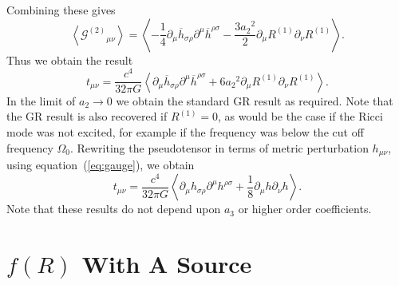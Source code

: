\documentclass[a4paper, 11pt, titlepage, twoside]{report}
\newcommand{\eqnref}[1]{equation~(\ref{eq:#1})}
\newcommand{\recip}[1]{\ensuremath{\frac{1}{#1}}}
\begin{document}
Combining these gives
\begin{equation}
\left\langle {\mathcal{G}^{(2)}}_{\mu\nu}\right\rangle = \left\langle -\recip{4} \partial_\mu\overline{h}_{\sigma\rho}\partial^\mu\overline{h}^{\rho\sigma} - \frac{3{a_2}^2}{2}\partial_\mu R^{(1)}\partial_\nu R^{(1)} \right\rangle.
\end{equation}
Thus we obtain the result
\begin{equation}
t_{\mu\nu} = \frac{c^4}{32\pi G}\left\langle \partial_\mu\overline{h}_{\sigma\rho}\partial^\mu\overline{h}^{\rho\sigma} + 6{a_2}^2\partial_\mu R^{(1)}\partial_\nu R^{(1)} \right\rangle.
\end{equation}
In the limit of $a_2 \rightarrow 0$ we obtain the standard GR result as required. Note that the GR result is also recovered if $R^{(1)} = 0$, as would be the case if the Ricci mode was not excited, for example if the frequency was below the cut off frequency $\Omega_0$. Rewriting the pseudotensor in terms of metric perturbation $h_{\mu\nu}$, using \eqnref{gauge}, we obtain
\begin{equation}
t_{\mu\nu} = \frac{c^4}{32\pi G}\left\langle \partial_\mu h_{\sigma\rho}\partial^\mu h^{\rho\sigma} + \recip{8}\partial_\mu h \partial_\nu h \right\rangle.
\end{equation}
Note that these results do not depend upon $a_3$ or higher order coefficients.

\section{$f(R)$ With A Source}
\end{document}
